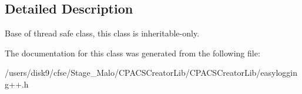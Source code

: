 \subsection{Detailed Description}
Base of thread safe class, this class is inheritable-\/only. 

The documentation for this class was generated from the following file\-:\begin{DoxyCompactItemize}
\item 
/users/disk9/cfse/\-Stage\-\_\-\-Malo/\-C\-P\-A\-C\-S\-Creator\-Lib/\-C\-P\-A\-C\-S\-Creator\-Lib/easylogging++.\-h\end{DoxyCompactItemize}
